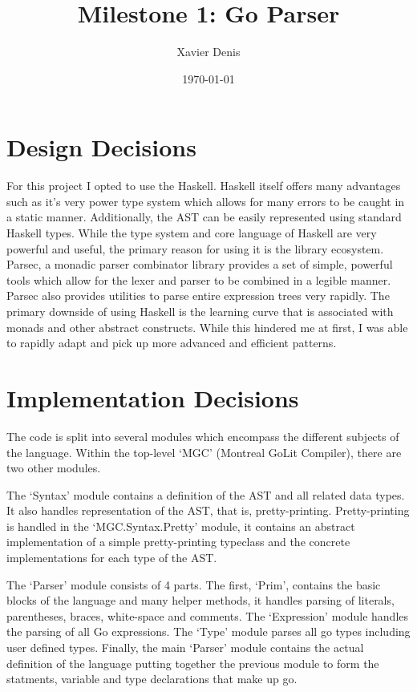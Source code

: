 \documentclass[11pt]{article}
\begin{document}

\title{Milestone 1: Go Parser}
\author{Xavier Denis}
\date{\today}
\maketitle

\section {Design Decisions}
For this project I opted to use the Haskell. Haskell itself offers many advantages such as it's very power type system which allows for many errors to be caught in a static manner. Additionally, the AST can be easily represented using standard Haskell types. While the type system and core language of Haskell are very powerful and useful, the primary reason for using it is the library ecosystem. Parsec, a monadic parser combinator library provides a set of simple, powerful tools which allow for the lexer and parser to be combined in a legible manner. Parsec also provides utilities to parse entire expression trees very rapidly. The primary downside of using Haskell is the learning curve that is associated with monads and other abstract constructs. While this hindered me at first, I was able to rapidly adapt and pick up more advanced and efficient patterns.

\section {Implementation Decisions}

The code is split into several modules which encompass the different subjects of the language. Within the top-level `MGC' (Montreal GoLit Compiler), there are two other modules. 

The `Syntax' module contains a definition of the AST and all related data types. It also handles representation of the AST, that is, pretty-printing. Pretty-printing is handled in the `MGC.Syntax.Pretty' module, it contains an abstract implementation of a simple pretty-printing typeclass and the concrete implementations for each type of the AST. 

The `Parser' module consists of 4 parts. The first, `Prim', contains the basic blocks of the language and many helper methods, it handles parsing of literals, parentheses, braces, white-space and comments. The `Expression' module handles the parsing of all Go expressions. The `Type' module parses all go types including user defined types. Finally, the main `Parser' module contains the actual definition of the language putting together the previous module to form the statments, variable and type declarations that make up go. 
\end{document}
